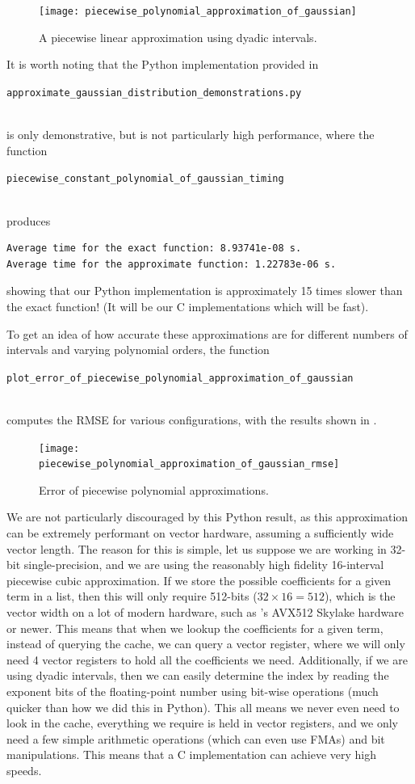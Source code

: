 \documentclass[11pt,a4paper,twoside,english]{extarticle}
\newcommand{\singlecodeline}[1]{\\[1em]\centerline{\lstinline[basicstyle=\ttfamily]$#1$}\\[1em]}
\begin{document}
\begin{figure}[htb]
\centering
\texttt{[image: piecewise\_polynomial\_approximation\_of\_gaussian]}
\caption{A piecewise linear approximation using dyadic intervals.}
\label{fig:piecewise_polynomial_approximation_of_gaussian}
\end{figure}

It is worth noting that the Python implementation provided in 
\singlecodeline{approximate_gaussian_distribution_demonstrations.py}
is only demonstrative, but is not particularly high performance, where the function \singlecodeline{piecewise_constant_polynomial_of_gaussian_timing}
produces
\begin{verbatim}
Average time for the exact function: 8.93741e-08 s.
Average time for the approximate function: 1.22783e-06 s.
\end{verbatim}
showing that our Python implementation is approximately 15 times slower than the exact function! (It will be our C implementations which will be fast). 

To get an idea of how accurate these approximations are for different numbers of intervals and varying polynomial orders, the function \singlecodeline{plot_error_of_piecewise_polynomial_approximation_of_gaussian} computes the RMSE for various configurations, with the results shown in .

\begin{figure}[htb]
\centering
\texttt{[image: piecewise\_polynomial\_approximation\_of\_gaussian\_rmse]}
\caption{Error of piecewise polynomial approximations.}
\label{fig:piecewise_polynomial_approximation_of_gaussian_rmse}
\end{figure}

We are not particularly discouraged by this Python result, as this approximation can be extremely performant on vector hardware, assuming a sufficiently wide vector length. The reason for this is simple, let us suppose we are working in 32-bit single-precision, and we are using the reasonably high fidelity 16-interval piecewise cubic approximation. If we store the possible coefficients for a given term in a list, then this will only require 512-bits ($ 32 \times 16 = 512 $), which is the vector width on a lot of modern hardware, such as \intel's AVX512 Skylake hardware or newer. This means that when we lookup the coefficients for a given term, instead of querying the cache, we can query a vector register, where we will only need 4 vector registers to hold all the coefficients we need. Additionally, if we are using dyadic intervals, then we can easily determine the index by reading the exponent bits of the floating-point number using bit-wise operations (much quicker than how we did this in Python). This all means we never even need to look in the cache, everything we require is held in vector registers, and we only need a few simple arithmetic operations (which can even use FMAs) and bit manipulations. This means that a C implementation can achieve very high speeds.
\end{document}
